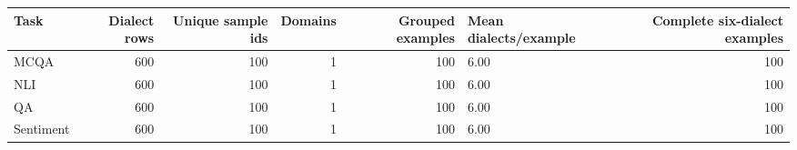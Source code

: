 \begin{tabular}{lrrrrlr}
\toprule
     Task &  Dialect rows &  Unique sample ids &  Domains &  Grouped examples & Mean dialects/example &  Complete six-dialect examples \\
\midrule
     MCQA &           600 &                100 &        1 &               100 &                  6.00 &                            100 \\
      NLI &           600 &                100 &        1 &               100 &                  6.00 &                            100 \\
       QA &           600 &                100 &        1 &               100 &                  6.00 &                            100 \\
Sentiment &           600 &                100 &        1 &               100 &                  6.00 &                            100 \\
\bottomrule
\end{tabular}
